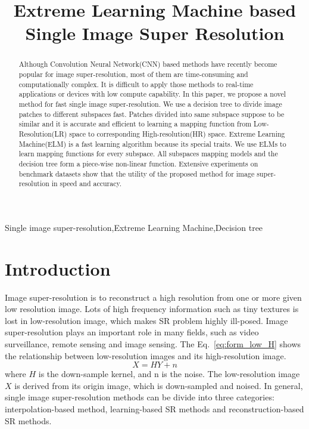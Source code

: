 \documentclass[review,numbers,sort&compress]{elsarticle}  %
\begin{document}
\begin{frontmatter}

\title{Extreme Learning Machine based Single Image Super Resolution}




\begin{abstract}
Although Convolution Neural Network(CNN) based methods have recently become popular for image super-resolution, most of them are time-consuming and computationally complex. It is difficult to apply those methods to real-time applications or devices with low compute capability. In this paper, we propose a novel method for fast single image super-resolution. We use a decision tree to divide image patches to different subspaces fast. Patches divided into same subspace suppose to be similar and it is accurate and efficient to learning a mapping function from Low-Resolution(LR) space to corresponding High-resolution(HR) space. Extreme Learning Machine(ELM) is a fast learning algorithm because its special traits. We use ELMs to learn mapping functions for every subspace. All subspaces mapping models and the decision tree form a piece-wise non-linear function. Extensive experiments on benchmark datasets show that the utility of the proposed method for image super-resolution in speed and accuracy.
\end{abstract}

\begin{keyword}
Single image super-resolution\sep Extreme Learning Machine\sep Decision tree
\end{keyword}
\end{frontmatter}



\section{Introduction}

Image super-resolution is to reconstruct a high resolution from one or more given low resolution image. Lots of high frequency information such as tiny textures is lost in low-resolution image, which makes SR problem highly ill-posed. Image super-resolution plays an important role in many fields, such as video surveillance, remote sensing and image sensing. The Eq.~\ref{eq:form_low_H} shows the relationship between low-resolution images and its high-resolution image.
\begin{equation}\label{eq:form_low_H}
   X = HY+n
\end{equation}
where $H$ is the down-sample kernel, and n is the noise. The low-resolution image $X$ is derived from its origin image, which is down-sampled and noised. In general, single image super-resolution methods can be divide into three categories: interpolation-based method, learning-based SR methods and reconstruction-based SR methods.
\end{document}
